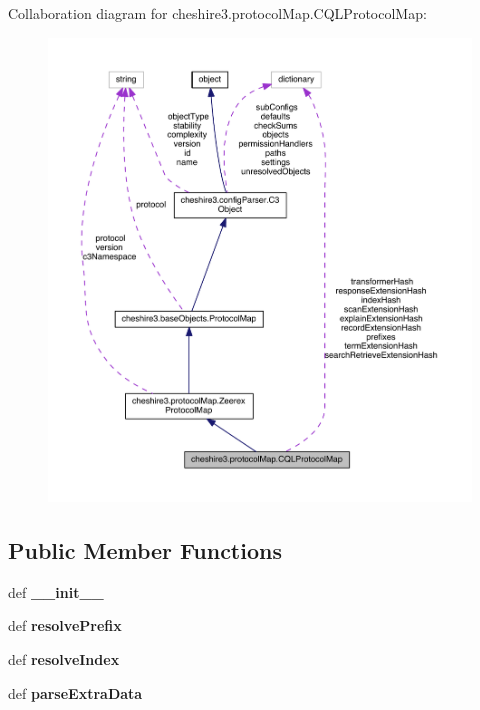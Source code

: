 Collaboration diagram for cheshire3.\-protocol\-Map.\-C\-Q\-L\-Protocol\-Map\-:
\nopagebreak
\begin{figure}[H]
\begin{center}
\leavevmode
\includegraphics[width=350pt]{classcheshire3_1_1protocol_map_1_1_c_q_l_protocol_map__coll__graph}
\end{center}
\end{figure}
\subsection*{Public Member Functions}
\begin{DoxyCompactItemize}
\item 
\hypertarget{classcheshire3_1_1protocol_map_1_1_c_q_l_protocol_map_ad2cc5f285fa7b68120c12681398d1e68}{def {\bfseries \-\_\-\-\_\-init\-\_\-\-\_\-}}\label{classcheshire3_1_1protocol_map_1_1_c_q_l_protocol_map_ad2cc5f285fa7b68120c12681398d1e68}

\item 
\hypertarget{classcheshire3_1_1protocol_map_1_1_c_q_l_protocol_map_a9ca6485478e8b5a0b77325b10ee3e1ed}{def {\bfseries resolve\-Prefix}}\label{classcheshire3_1_1protocol_map_1_1_c_q_l_protocol_map_a9ca6485478e8b5a0b77325b10ee3e1ed}

\item 
\hypertarget{classcheshire3_1_1protocol_map_1_1_c_q_l_protocol_map_abb0be5df3d543c65d1f308be03e7ce97}{def {\bfseries resolve\-Index}}\label{classcheshire3_1_1protocol_map_1_1_c_q_l_protocol_map_abb0be5df3d543c65d1f308be03e7ce97}

\item 
\hypertarget{classcheshire3_1_1protocol_map_1_1_c_q_l_protocol_map_aca45eb79498047118b43306fb4248a6e}{def {\bfseries parse\-Extra\-Data}}\label{classcheshire3_1_1protocol_map_1_1_c_q_l_protocol_map_aca45eb79498047118b43306fb4248a6e}

\end{DoxyCompactItemize}
